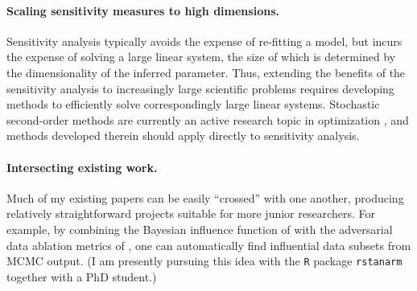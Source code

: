 \paragraph{Scaling sensitivity measures to high dimensions.}

Sensitivity analysis typically avoids the expense of re-fitting a model, but
incurs the expense of solving a large linear system, the size of which is
determined by the dimensionality of the inferred parameter.  Thus, extending the
benefits of the sensitivity analysis to increasingly large scientific problems
requires developing methods to efficiently solve correspondingly large linear
systems. Stochastic second-order methods are currently an active research topic
in optimization \citep{agarwal:2017:secondorder, berahas:2020:newtonsketch}, and
methods developed therein should apply directly to sensitivity analysis.



\paragraph{Intersecting existing work.}

Much of my existing papers can be easily ``crossed'' with one another, producing
relatively straightforward projects suitable for more junior researchers.  For
example, by combining the Bayesian influence function of
\citet{giordano:2021:bayesij} with the adversarial data ablation metrics of
\citet{giordano:2020:amip}, one can automatically find influential data subsets
from MCMC output.  (I am presently pursuing this idea with the \texttt{R}
package \texttt{rstanarm} together with a PhD student.)


\newpage





